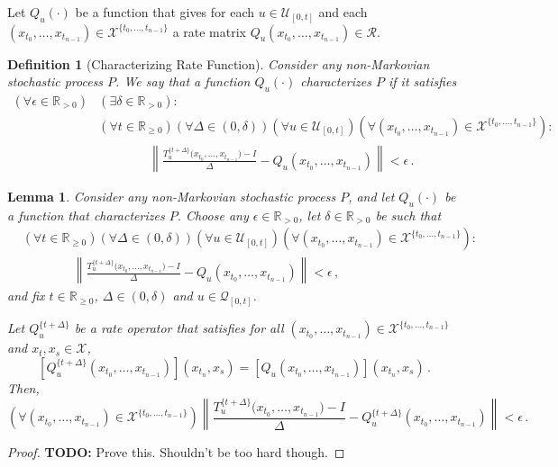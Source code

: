 \documentclass[10pt]{paper}
\newtheorem{lemma}[theorem]{Lemma}
\newtheorem{definition}{Definition}
\newcommand{\reals}{\mathbb{R}}
\newcommand{\realspos}{\reals_{>0}}
\newcommand{\realsnonneg}{\reals_{\geq 0}}
\newcommand{\states}{\mathcal{X}}
\newcommand{\norm}[1]{\left\lVert #1 \right\rVert}
\begin{document}
\noindent Let $Q_u(\cdot)$ be a function that gives for each $u\in\mathcal{U}_{[0,t]}$ and each $(x_{t_0},\ldots,x_{t_{n-1}})\in\states^{\{t_0,\ldots,t_{n-1}\}}$ a rate matrix $Q_u(x_{t_0},\ldots,x_{t_{n-1}})\in\mathcal{R}$.

\begin{definition}[Characterizing Rate Function]\label{def:nonmarkov_char_rate}
Consider any non-Markovian stochastic process $P$. We say that a function $Q_u(\cdot)$ \emph{characterizes} $P$ if it satisfies
\begin{align*}
(\forall \epsilon\in\realspos)&(\exists \delta\in\realspos): \\
&(\forall t\in\realsnonneg)(\forall \Delta\in(0,\delta))(\forall u\in\mathcal{U}_{[0,t]})(\forall (x_{t_0},\ldots,x_{t_{n-1}})\in\states^{\{t_0,\ldots,t_{n-1}\}}): \\
&\quad\quad\quad\quad\norm{\frac{T_u^{\{t+\Delta\}}\bigl(x_{t_0},\ldots,x_{t_{n-1}}\bigr) - I}{\Delta} - Q_u(x_{t_0},\ldots,x_{t_{n-1}})} < \epsilon\,.
\end{align*}
\end{definition}

\begin{lemma}\label{lemma:rate_exists_implies_rate_op_exists}
Consider any non-Markovian stochastic process $P$, and let $Q_u(\cdot)$ be a function that characterizes $P$. Choose any $\epsilon\in\realspos$, let $\delta\in\realspos$ be such that
\begin{align*}
&(\forall t\in\realsnonneg)(\forall \Delta\in(0,\delta))(\forall u\in\mathcal{U}_{[0,t]})(\forall (x_{t_0},\ldots,x_{t_{n-1}})\in\states^{\{t_0,\ldots,t_{n-1}\}}): \\
&\quad\quad\quad\quad\norm{\frac{T_u^{\{t+\Delta\}}\bigl(x_{t_0},\ldots,x_{t_{n-1}}\bigr) - I}{\Delta} - Q_u(x_{t_0},\ldots,x_{t_{n-1}})} < \epsilon\,,
\end{align*}
and fix $t\in\realsnonneg$, $\Delta\in(0,\delta)$ and $u\in\mathcal{Q}_{[0,t]}$.

Let $Q_u^{\{t+\Delta\}}$ be a rate operator that satisfies for all $(x_{t_0},\ldots,x_{t_{n-1}})\in\states^{\{t_0,\ldots,t_{n-1}\}}$ and $x_t,x_s\in\states$,
\begin{equation*}
\left[Q_u^{\{t+\Delta\}}(x_{t_0},\ldots,x_{t_{n-1}})\right](x_{t_n},x_s) = \left[Q_u(x_{t_0},\ldots,x_{t_{n-1}})\right](x_{t_n},x_s)\,.
\end{equation*}
Then,
\begin{equation*}
(\forall (x_{t_0},\ldots,x_{t_{n-1}})\in\states^{\{t_0,\ldots,t_{n-1}\}})
\norm{\frac{T_u^{\{t+\Delta\}}\bigl(x_{t_0},\ldots,x_{t_{n-1}}\bigr) - I}{\Delta} - Q_u^{\{t+\Delta\}}(x_{t_0},\ldots,x_{t_{n-1}})} < \epsilon\,.
\end{equation*}
\end{lemma}
\begin{proof}
{\bf TODO:} Prove this. Shouldn't be too hard though.
\end{proof}
\end{document}
